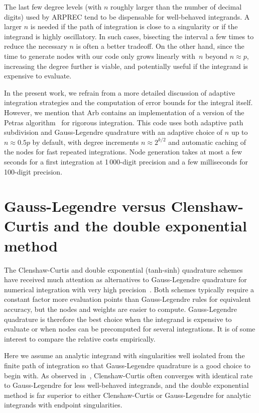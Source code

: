 \documentclass[nohypdvips,review]{siamart0216}
\begin{document}
The last few degree levels (with $n$ roughly larger than
the number of decimal digits) used by ARPREC
tend to be dispensable for well-behaved integrands.
A larger $n$ is needed if the path of integration
is close to a singularity or if the integrand is highly oscillatory.
In such cases, bisecting the interval a few times
to reduce the necessary $n$ is often a better tradeoff.
On the other hand, since the time to generate nodes with our code only
grows linearly with~$n$ beyond $n \approx p$,
increasing the degree further is viable,
and potentially useful if the integrand is expensive to evaluate.

In the present work, we refrain from a more detailed discussion of
adaptive integration strategies and the computation
of error bounds for the integral itself.
However, we mention that Arb contains an implementation of a
version of the Petras algorithm~\cite{petras2002self} for rigorous
integration. This code uses both adaptive path subdivision
and Gauss-Legendre quadrature with an adaptive choice of $n$ up to
$n \approx 0.5p$ by default, with degree increments
$n \approx 2^{k/2}$ and automatic caching of the nodes
for fast repeated integrations.
Node generation takes at most a few seconds for a first integration
at 1\,000-digit precision
and a few milliseconds for 100-digit precision.

\section{Gauss-Legendre versus Clenshaw-Curtis and the double exponential method}

\label{sec:vsothers}

The Clenshaw-Curtis and double exponential (tanh-sinh) quadrature schemes
have received much attention as alternatives to Gauss-Legendre
quadrature for numerical integration with very high precision~\cite{takahasi1974double,bailey2011high,trefethen2008gauss}.
Both schemes
typically require a constant factor more evaluation points than Gauss-Legendre rules
for equivalent accuracy, but the nodes and weights are easier to compute.
Gauss-Legendre quadrature is therefore the best choice
when the integrand is expensive to evaluate or when nodes can
be precomputed for several integrations.
It is of some interest to compare the relative costs empirically.

Here we assume an analytic integrand with singularities well isolated from
the finite path of integration so that Gauss-Legendre quadrature is a good
choice to begin with. As observed in~\cite{trefethen2008gauss},
Clenshaw-Curtis often converges with identical rate to Gauss-Legendre for
less well-behaved integrands,
and the double exponential method is far superior to either
Clenshaw-Curtis or Gauss-Legendre for
analytic integrands with endpoint singularities.
\end{document}
